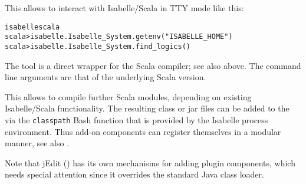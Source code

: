 \begin{isabellebody}
\begin{isamarkuptext}
  This allows to interact with Isabelle/Scala in TTY mode like this:
\begin{alltt}
  isabelle scala
  scala> isabelle.Isabelle_System.getenv("ISABELLE_HOME")
  scala> isabelle.Isabelle_System.find_logics()
\end{alltt}%
\end{isamarkuptext}%
\isamarkuptrue%
%
\isamarkuptrue%
%
\begin{isamarkuptext}%
The \hypertarget{tool.scalac}{\hyperlink{tool.scalac}{\mbox{}}} tool is a direct wrapper for the Scala
  compiler; see also \hyperlink{tool.scala}{\mbox{}} above.  The command line arguments
  are that of the underlying Scala version.

  This allows to compile further Scala modules, depending on existing
  Isabelle/Scala functionality.  The resulting class or jar files can
  be added to the \hyperlink{setting.CLASSPATH}{\mbox{}} via the \verb|classpath|
  Bash function that is provided by the Isabelle process environment.
  Thus add-on components can register themselves in a modular manner,
  see also .

  Note that jEdit () has its own mechanisms for
  adding plugin components, which needs special attention since
  it overrides the standard Java class loader.%
\end{isamarkuptext}%
\isamarkuptrue%
%
\isadelimtheory
%
\endisadelimtheory
%
\isatagtheory
{}\isamarkupfalse%
%
\endisatagtheory
{\isafoldtheory}%
%
\isadelimtheory
%
\endisadelimtheory
\isanewline
\end{isabellebody}%
